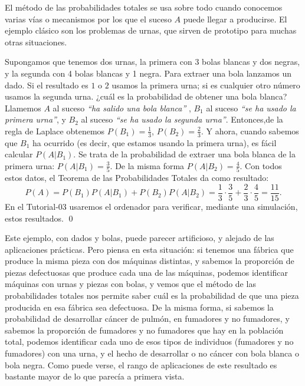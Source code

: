 El método de las probabilidades totales se usa sobre todo cuando conocemos varias vías o mecanismos por los que el suceso $A$ puede llegar a producirse. El ejemplo clásico son los {\sf problemas de urnas}, que sirven de prototipo para muchas otras situaciones.
    \begin{Ejemplo}
    \label{cap03:ejem:ProbailidadTotalEjemploUrnas}
        Supongamos que tenemos dos urnas, la primera con 3 bolas blancas y dos negras, y la segunda con 4 bolas blancas y 1 negra. Para extraer una bola lanzamos un dado. Si el resultado es $1$ o $2$ usamos la primera urna; si es cualquier otro número usamos la segunda urna. ¿cuál es la probabilidad de obtener una bola blanca?\\
        Llamemos $A$ al suceso {\em ``ha salido una bola blanca''} ,  $B_1$ al suceso {\em ``se ha usado la primera urna''}, y $B_2$ al suceso {\em ``se ha usado la segunda urna''}. Entonces,de la regla de Laplace obtenemos $P(B_1)=\frac{1}{3}$, $P(B_2)=\frac{2}{3}$. Y ahora, cuando sabemos que $B_1$ ha ocurrido (es decir, que estamos usando la primera urna), es fácil calcular $P(A|B_1)$.  Se trata de la probabilidad de extraer una bola blanca de la primera urna: $P(A|B_1)=\frac{3}{5}.$ De la misma forma $P(A|B_2)=\frac{4}{5}$. Con todos estos datos, el Teorema de las Probabilidades Totales da como resultado:
        \[P(A)=P(B_1)P(A|B_1)+P(B_2)P(A|B_2)=
        \dfrac{1}{3}\cdot\dfrac{3}{5}+\dfrac{2}{3}\cdot\dfrac{4}{5}=\dfrac{11}{15}.\]
        En el Tutorial-03 usaremos el ordenador para verificar, mediante una simulación, estos resultados.
    \qed
    \end{Ejemplo}
Este ejemplo, con dados y bolas, puede parecer artificioso, y alejado de las aplicaciones prácticas. Pero piensa en esta situación: si tenemos una fábrica que produce la misma pieza con dos máquinas distintas, y sabemos la proporción de piezas defectuosas que produce cada una de las máquinas, podemos identificar máquinas con urnas y piezas con bolas, y vemos que el método de las probabilidades totales nos permite saber cuál es la probabilidad de que una pieza producida en esa fábrica sea defectuosa. De la misma forma, si sabemos la probabilidad de desarrollar cáncer de pulmón, en  fumadores y no fumadores, y sabemos la proporción de fumadores y no fumadores que hay en la población total, podemos identificar cada uno de esos tipos de individuos (fumadores y no fumadores) con una urna, y el hecho de desarrollar o no cáncer con bola blanca o bola negra. Como puede verse, el rango de aplicaciones de este resultado es bastante mayor de lo que parecía a primera vista.


